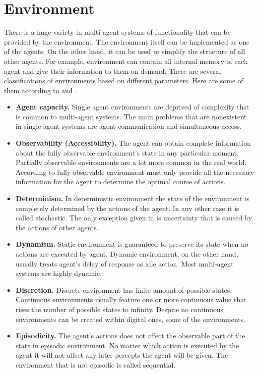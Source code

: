 \section{Environment}

There is a huge variety in multi-agent systems of functionality that can be provided by the environment. The environment itself can be implemented as one of the agents. On the other hand, it can be used to simplify the structure of all other agents. For example, environment can contain all internal memory of each agent and give their information to them on demand. There are several classifications of environments based on different parameters. Here are some of them according to \cite{DUMMY:1} and \cite{ArtInt}.
\begin{itemize}
\item \textbf{Agent capacity.} Single agent environments are deprived of complexity that is common to multi-agent systems. The main problems that are nonexistent in single agent systems are agent communication and simultaneous access.
\item \textbf{Observability (Accessibility).}  The agent can obtain complete information about the fully observable environment's state in any particular moment. Partially observable environments are a lot more common in the real world. According to \cite{ArtInt} fully observable environment must only provide all the necessary information for the agent to determine the optimal course of actions.
\item \textbf{Determinism.} In deterministic environment the state of the environment is completely determined by the actions of the agent. In any other case it is called stochastic. The only exception given in \cite{ArtInt} is uncertainty that is caused by the actions of other agents.
\item \textbf{Dynamism.} Static environment is guaranteed to preserve its state when no actions are executed by agent. Dynamic environment, on the other hand, usually treats agent's delay of response as idle action. Most multi-agent systems are highly dynamic.
\item \textbf{Discretion.} Discrete environment has finite amount of possible states. Continuous environments usually feature one or more continuous value that rises the number of possible states to infinity. Despite no continuous environments can be created within digital ones, some of the environments.
\item \textbf{Episodicity.} The agent's actions does not affect the observable part of the state in episodic environment. No matter which action is executed by the agent it will not affect any later percepts the agent will be given. The environment that is not episodic is called sequential.
\end{itemize}

